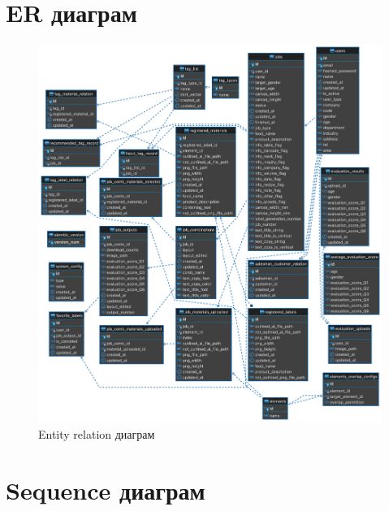 \section{ER диаграм}
\begin{figure}[h!]
	\centering
	\includegraphics[scale=0.2]{src/pictures/erd.png}
	\caption{Entity relation диаграм}
\end{figure}
\section{Sequence диаграм}

